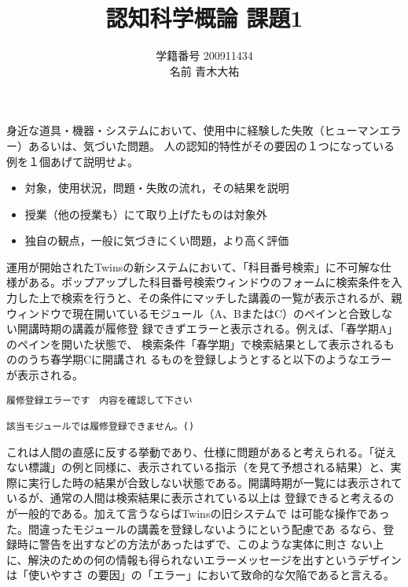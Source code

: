 \documentclass[a4j,9pt]{jsarticle}
\title{認知科学概論 課題1}
\author{学籍番号 200911434 \\ 名前 青木大祐}
\begin{document}
\maketitle
\setcounter{subsection}{100}

\begin{screen}
身近な道具・機器・システムにおいて、使用中に経験した失敗（ヒューマンエラー）あるいは、気づいた問題。
人の認知的特性がその要因の１つになっている例を１個あげて説明せよ。
\begin{itemize}
 \item 対象，使用状況，問題・失敗の流れ，その結果を説明
 \item 授業（他の授業も）にて取り上げたものは対象外
 \item 独自の観点，一般に気づきにくい問題，より高く評価
\end{itemize}
\end{screen}
\vspace*{2zh}

運用が開始されたTwinsの新システムにおいて、「科目番号検索」に不可解な仕
様がある。ポップアップした科目番号検索ウィンドウのフォームに検索条件を入
力した上で検索を行うと、その条件にマッチした講義の一覧が表示されるが、親
ウィンドウで現在開いているモジュール（A、BまたはC）のペインと合致しない開講時期の講義が履修登
録できずエラーと表示される。例えば、「春学期A」のペインを開いた状態で、
検索条件「春学期」で検索結果として表示されるもののうち春学期Cに開講され
るものを登録しようとすると以下のようなエラーが表示される。
\vspace*{1zh}
\begin{lstlisting}
履修登録エラーです　内容を確認して下さい

該当モジュールでは履修登録できません。()
\end{lstlisting}
\vspace*{1zh}
これは人間の直感に反する挙動であり、仕様に問題があると考えられる。「従え
ない標識」の例と同様に、表示されている指示（を見て予想される結果）と、実
際に実行した時の結果が合致しない状態である。開講時期が一覧には表示されているが、通常の人間は検索結果に表示されている以上は
登録できると考えるのが一般的である。加えて言うならばTwinsの旧システムで
は可能な操作であった。間違ったモジュールの講義を登録しないようにという配慮であ
るなら、登録時に警告を出すなどの方法があったはずで、このような実体に則さ
ない上に、解決のための何の情報も得られないエラーメッセージを出すというデザインは「使いやすさ
の要因」の「エラー」において致命的な欠陥であると言える。
\end{document}
